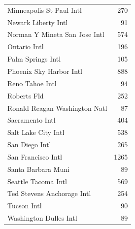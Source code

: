 \documentclass[12pt,twoside]{reedthesis}
\begin{document}
\begin{longtable}[t]{lr}
\addlinespace
Minneapolis St Paul Intl & 270\\
Newark Liberty Intl & 91\\
Norman Y Mineta San Jose Intl & 574\\
Ontario Intl & 196\\
Palm Springs Intl & 105\\
\addlinespace
Phoenix Sky Harbor Intl & 888\\
Reno Tahoe Intl & 94\\
Roberts Fld & 252\\
Ronald Reagan Washington Natl & 87\\
Sacramento Intl & 404\\
\addlinespace
Salt Lake City Intl & 538\\
San Diego Intl & 265\\
San Francisco Intl & 1265\\
Santa Barbara Muni & 89\\
Seattle Tacoma Intl & 569\\
\addlinespace
Ted Stevens Anchorage Intl & 254\\
Tucson Intl & 90\\
Washington Dulles Intl & 89\\*
\end{longtable}
\endgroup{}
\end{document}
